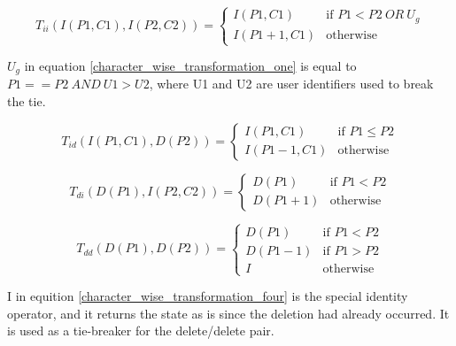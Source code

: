 \documentclass[9pt, titlepage]{article}
\begin{document}
  \small

  \begin{equation} \label{character_wise_transformation_one}
    T_{ii}(I(P1, C1), I(P2, C2)) =
    \left\{
	    \begin{array}{ll}
		    I(P1, C1) & \mbox{if } P1 < P2\ OR\ U_{g} \\
		    I(P1+1, C1) & \mbox{otherwise }
	    \end{array}
    \right.
  \end{equation}

  \(U_{g}\) in equation \ref{character_wise_transformation_one} is equal to \(P1 == P2 \ AND\ U1 > U2 \),
  where U1 and U2 are user identifiers used to break the tie.

  \begin{equation} \label{character_wise_transformation_two}
    T_{id}(I(P1, C1), D(P2)) =
    \left\{
	    \begin{array}{ll}
		    I(P1, C1) & \mbox{if } P1 \leq P2 \\
		    I(P1-1, C1) & \mbox{otherwise}
	    \end{array}
    \right.
  \end{equation}

  \begin{equation} \label{character_wise_transformation_three}
    T_{di}(D(P1), I(P2, C2)) =
    \left\{
	    \begin{array}{ll}
		    D(P1) & \mbox{if } P1 < P2 \\
		    D(P1+1) & \mbox{otherwise}
	    \end{array}
    \right.
  \end{equation}

  \begin{equation} \label{character_wise_transformation_four}
    T_{dd}(D(P1), D(P2)) =
    \left\{
	    \begin{array}{ll}
		    D(P1) & \mbox{if } P1 < P2 \\
		    D(P1-1) & \mbox{if } P1 > P2 \\
        I & \mbox{otherwise }
	    \end{array}
    \right.
  \end{equation}

  \normalfont

  I in equition \ref{character_wise_transformation_four} is the special identity operator,
  and it returns the state as is since the deletion had already occurred. It is used as a tie-breaker for the delete/delete pair.
  
\end{document}
